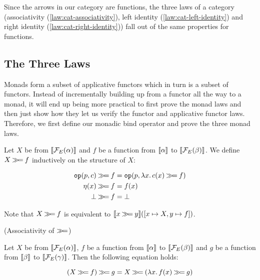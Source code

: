 Since the arrows in our category are functions, the three laws of a
category (associativity (\ref{law:cat-associativity}), left identity
(\ref{law:cat-left-identity}) and right identity
(\ref{law:cat-right-identity})) fall out of the same properties for
functions.


\subsection{The Three Laws}
\label{ssec:three-laws}

Monads form a subset of applicative functors which in turn is a subset of
functors. Instead of incrementally building up from a functor all the way
to a monad, it will end up being more practical to first prove the monad
laws and then just show how they let us verify the functor and applicative
functor laws. Therefore, we first define our monadic bind operator and
prove the three monad laws.

\begin{definition}\label{def:bind}
  Let $X$ be from $\llbracket \mathcal{F}_E(\alpha) \rrbracket$ and $f$ be a function from
  $\llbracket \alpha \rrbracket$ to $\llbracket \mathcal{F}_E(\beta) \rrbracket$. We define $X \mathbin{\gg\!=} f$
  inductively on the structure of $X$:

  \begin{align*}
    \mathtt{op}(p, c) \mathbin{\gg\!=} f &= \mathtt{op}(p, \lambda x.\, c(x) \mathbin{\gg\!=} f) \\
    \eta(x) \mathbin{\gg\!=} f &= f(x) \\
    \bot \mathbin{\gg\!=} f &= \bot
  \end{align*}

  Note that $X \mathbin{\gg\!=} f$ is equivalent to
  $\llbracket x \mathbin{\gg\!=} y \rrbracket([x \mapsto X, y \mapsto f])$.
\end{definition}

\begin{law}\label{law:associativity}
  (Associativity of $\mathbin{\gg\!=}$)
  
  Let $X$ be from $\llbracket \mathcal{F}_E(\alpha) \rrbracket$, $f$ be a function from
  $\llbracket \alpha \rrbracket$ to $\llbracket \mathcal{F}_E(\beta) \rrbracket$ and $g$ be a function from
  $\llbracket \beta \rrbracket$ to $\llbracket \mathcal{F}_E(\gamma) \rrbracket$. Then the following equation
  holds:
  
  $$
  (X \mathbin{\gg\!=} f) \mathbin{\gg\!=} g = X \mathbin{\gg\!=} (\lambda x.\, f(x) \mathbin{\gg\!=} g)
  $$
\end{law}

